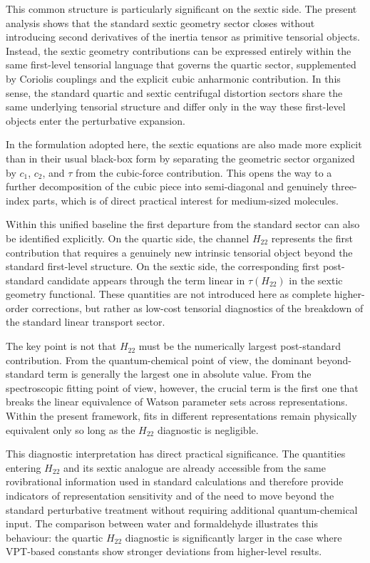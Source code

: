 \documentclass[journal=jacsat,manuscript=article]{achemso}
\begin{document}
This common structure is particularly significant on the sextic side.
The present analysis shows that the standard sextic geometry sector
closes without introducing second derivatives of the inertia tensor as
primitive tensorial objects. Instead, the sextic geometry contributions
can be expressed entirely within the same first-level tensorial language
that governs the quartic sector, supplemented by Coriolis couplings and
the explicit cubic anharmonic contribution. In this sense, the standard
quartic and sextic centrifugal distortion sectors share the same
underlying tensorial structure and differ only in the way these
first-level objects enter the perturbative expansion.

In the formulation adopted here, the sextic equations are also made more
explicit than in their usual black-box form by separating the geometric
sector organized by $c_1$, $c_2$, and $\tau$ from the cubic-force
contribution. This opens the way to a further decomposition of the cubic
piece into semi-diagonal and genuinely three-index parts, which is of
direct practical interest for medium-sized molecules.

Within this unified baseline the first departure from the standard sector
can also be identified explicitly. On the quartic side, the channel
$H_{22}$ represents the first contribution that requires a genuinely new
intrinsic tensorial object beyond the standard first-level structure.
On the sextic side, the corresponding first post-standard candidate
appears through the term linear in $\tau(H_{22})$ in the sextic geometry
functional. These quantities are not introduced here as complete
higher-order corrections, but rather as low-cost tensorial diagnostics of
the breakdown of the standard linear transport sector.

The key point is not that $H_{22}$ must be the numerically largest
post-standard contribution. From the quantum-chemical point of view, the
dominant beyond-standard term is generally the largest one in absolute
value. From the spectroscopic fitting point of view, however, the crucial
term is the first one that breaks the linear equivalence of Watson
parameter sets across representations. Within the present framework,
fits in different representations remain physically equivalent only so
long as the $H_{22}$ diagnostic is negligible.

This diagnostic interpretation has direct practical significance. The
quantities entering $H_{22}$ and its sextic analogue are already
accessible from the same rovibrational information used in standard
calculations and therefore provide indicators of representation
sensitivity and of the need to move beyond the standard perturbative
treatment without requiring additional quantum-chemical input. The
comparison between water and formaldehyde illustrates this behaviour:
the quartic $H_{22}$ diagnostic is significantly larger in the case
where VPT-based constants show stronger deviations from higher-level
results.
\end{document}
